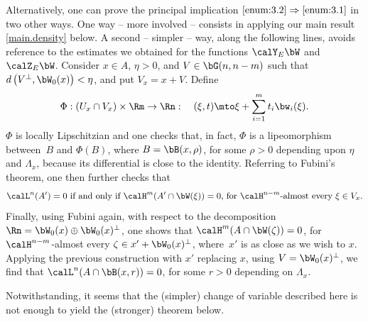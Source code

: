 \begin{Remark}
\label{remark}
Alternatively, one can prove the principal implication $\eqref{enum:3.2}\Rightarrow \eqref{enum:3.1}$ in two other ways.
One way -- more involved -- consists in applying our main result \ref{main.density} below.
A second -- simpler -- way, along the following lines, avoids reference to the estimates we obtained for the functions $\calY_E \bW$ and $\calZ_E \bW$.
Consider $x \in A$, $\eta > 0$, and $V \in \bG(n,n-m)$ such that $d\left(V^\perp, \bW_0(x) \right) < \eta$, and put $V_x = x + V$.
Define
\begin{equation*}
\Phi: (U_x \cap V_x) \times \Rm \to \Rn:\quad (\xi,t) \mto \xi + \sum_{i=1}^m t_i \bw_i(\xi).
\end{equation*}
$\Phi$ is locally Lipschitzian and one checks that, in fact, $\Phi$ is a lipeomorphism between~$B$ and $\Phi(B)$, where $B = \bB(x,\rho)$, for some $\rho > 0$ depending upon $\eta$ and $\Lambda_x$, because its differential is close to the identity.
Referring to Fubini's theorem, one then further checks that
\begin{equation*}
\calL^n(A') = 0 \text{ if and only if } \calH^m(A' \cap \bW(\xi)) = 0 \text{, for $\calH^{n-m}$-almost every } \xi \in V_x.
\end{equation*}
Finally, using Fubini again, with respect to the decomposition $\Rn = \bW_0(x) \oplus \bW_0(x)^\perp$, one shows that $\calH^m(A \cap \bW(\zeta))=0$, for $\calH^{n-m}$-almost every $\zeta \in x' + \bW_0(x)^\perp$, where~$x'$ is as close as we wish to $x$.
Applying the previous construction with $x'$ replacing $x$, using $V = \bW_0(x)^\perp$, we find that $\calL^n(A \cap \bB(x,r))=0$, for some $r > 0$ depending on $\Lambda_x$.
\par
Notwithstanding, it seems that the (simpler) change of variable described here is not enough to yield the (stronger) theorem below.
\end{Remark}

